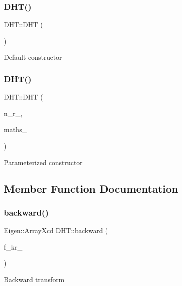 \subsubsection{\texorpdfstring{DHT()}{DHT()}\hspace{0.1cm}{\footnotesize\ttfamily [1/2]}}
{\footnotesize\ttfamily D\+H\+T\+::\+D\+HT (\begin{DoxyParamCaption}{ }\end{DoxyParamCaption})}

Default constructor \mbox{\label{class_d_h_t_a9f6e442f2bc6f1e2f5d2dd2a3f9a557d}} 
\subsubsection{\texorpdfstring{DHT()}{DHT()}\hspace{0.1cm}{\footnotesize\ttfamily [2/2]}}
{\footnotesize\ttfamily D\+H\+T\+::\+D\+HT (\begin{DoxyParamCaption}\item[{int}]{n\+\_\+r\+\_\+,  }\item[{\mbox{\hyperlink{classmaths__textbook}{maths\+\_\+textbook}} \&}]{maths\+\_\+ }\end{DoxyParamCaption})}

Parameterized constructor 

\subsection{Member Function Documentation}
\mbox{\label{class_d_h_t_a923f3d375e55f2dbdab2763de372f440}} 
\subsubsection{\texorpdfstring{backward()}{backward()}}
{\footnotesize\ttfamily Eigen\+::\+Array\+Xcd D\+H\+T\+::backward (\begin{DoxyParamCaption}\item[{Eigen\+::\+Array\+Xcd}]{f\+\_\+kr\+\_\+ }\end{DoxyParamCaption})}

Backward transform \mbox{\label{class_d_h_t_a916089f65c6ad05eace5e1f9854f50f4}} 
